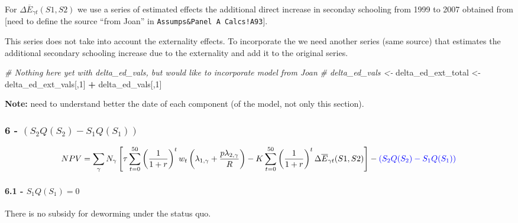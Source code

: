\documentclass[]{article}
\newenvironment{Shaded}{\begin{snugshade}}{\end{snugshade}}
\newcommand{\CommentTok}[1]{\textcolor[rgb]{0.56,0.35,0.01}{\textit{#1}}}
\newcommand{\DecValTok}[1]{\textcolor[rgb]{0.00,0.00,0.81}{#1}}
\newcommand{\NormalTok}[1]{#1}
\newcommand{\OperatorTok}[1]{\textcolor[rgb]{0.81,0.36,0.00}{\textbf{#1}}}
\newcommand{\StringTok}[1]{\textcolor[rgb]{0.31,0.60,0.02}{#1}}
\let\oldparagraph\paragraph
\renewcommand{\paragraph}[1]{\oldparagraph{#1}\mbox{}}
\begin{document}
For \(\Delta \overline{E}_{\gamma t}(S1,S2)\) we use a series of
estimated effects the additional direct increase in seconday schooling
from 1999 to 2007 obtained from {[}need to define the source ``from
Joan'' in \texttt{Assumps\&Panel\ A\ Calcs!A93}{]}.

This series does not take into account the externality effects. To
incorporate the we need another series (same source) that estimates the
additional secondary schooling increase due to the externality and add
it to the original series.

\begin{Shaded}
\begin{Highlighting}[]
\CommentTok{# Nothing here yet with delta_ed_vals, but would like to incorporate model from Joan}
\CommentTok{# delta_ed_vals <- }
\NormalTok{delta_ed_ext_total <-}\StringTok{ }\NormalTok{delta_ed_ext_vals[,}\DecValTok{1}\NormalTok{] }\OperatorTok{+}\StringTok{ }\NormalTok{delta_ed_vals[,}\DecValTok{1}\NormalTok{]}
\end{Highlighting}
\end{Shaded}

\textbf{Note:} need to understand better the date of each component (of
the model, not only this section).

\hypertarget{left-s_2qs_2---s_1qs_1-right}{%
\subsubsection{\texorpdfstring{6 -
\(\left( S_{2}Q(S_{2}) - S_{1}Q(S_{1}) \right)\)}{6 - \textbackslash{}left( S\_\{2\}Q(S\_\{2\}) - S\_\{1\}Q(S\_\{1\}) \textbackslash{}right)}}\label{left-s_2qs_2---s_1qs_1-right}}

\begin{equation}
NPV =  \sum_{\gamma} N_{\gamma} \left[ 
\tau \sum_{t=0}^{50}\left(  \frac{1}{1 + r}\right)^{t} w_{t} 
\left( \lambda_{1, \gamma}  + \frac{p \lambda_{2, \gamma}}{R} \right) - 
K \sum_{t=0}^{50} \left( \frac{1}{1 + r}\right)^{t} \Delta \overline{E}_{\gamma t}(S1,S2)
\right] - \color{blue}{ \left( S_{2}Q(S_{2}) - S_{1}Q(S_{1}) \right) }
\end{equation}

\hypertarget{s_1qs_1-0}{%
\paragraph{\texorpdfstring{6.1 -
\(S_{1}Q(S_{1}) = 0\)}{6.1 - S\_\{1\}Q(S\_\{1\}) = 0}}\label{s_1qs_1-0}}

There is no subsidy for deworming under the status quo.
\end{document}
